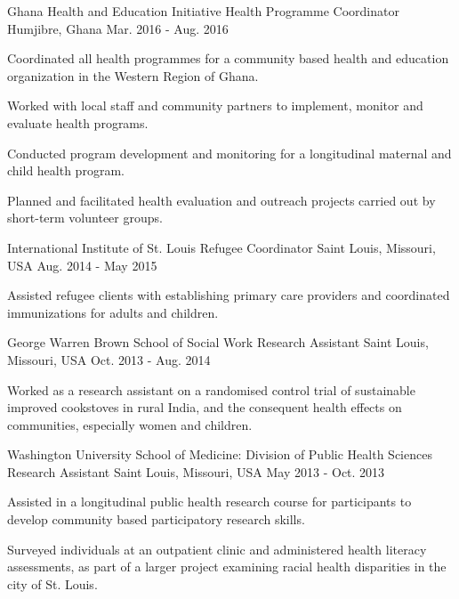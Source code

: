 \begin{cventries}
\vspace{-2ex}
\cventry
     {Ghana Health and Education Initiative}
     {Health Programme Coordinator}
     {Humjibre, Ghana}
     {Mar. 2016 - Aug. 2016}
     {
   \begin{cvitems}
         \item {Coordinated all health programmes for a community based health and education organization in the Western Region of Ghana.} 
 \item {Worked with local staff and community partners to implement, monitor and evaluate health programs.} \item 
 {Conducted program development and monitoring for a longitudinal maternal and child health program.} \item {Planned and facilitated health evaluation and outreach projects carried out by short-term volunteer groups.}
       \end{cvitems}
     }


\vspace{-2ex}
  \cventry
    {International Institute of St. Louis}
    {Refugee Coordinator}
    {Saint Louis, Missouri, USA}
    {Aug. 2014 - May 2015}
    {
      \begin{cvitems}
        \item {Assisted refugee clients with establishing primary care providers and coordinated immunizations for adults and children.}
          \end{cvitems} 
    }

\vspace{-2ex}
  \cventry
    {George Warren Brown School of Social Work}
    {Research Assistant}
    {Saint Louis, Missouri, USA}
    {Oct. 2013 - Aug. 2014}
    {
      \begin{cvitems}
        \item {Worked as a research assistant on a randomised control trial of sustainable improved cookstoves in rural India, and the consequent health effects on communities, especially women and children.}
      \end{cvitems}
    }

\vspace{-2ex}
  \cventry
    {Washington University School of Medicine: Division of Public Health Sciences}
    {Research Assistant}
    {Saint Louis, Missouri, USA}
    {May 2013 - Oct. 2013}
    {
      \begin{cvitems}
        \item {Assisted in a longitudinal public health research course for participants to develop community based participatory research skills.}
        \item {Surveyed individuals at an outpatient clinic and administered health literacy assessments, as part of a larger project examining racial health disparities in the city of St. Louis.}
      \end{cvitems}
    }


\end{cventries}
